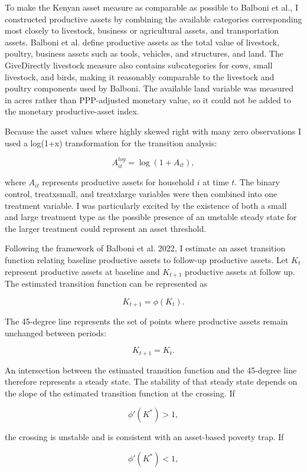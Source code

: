 \documentclass[9pt,twoside]{pnas-new}
\begin{document}
To make the Kenyan asset measure as comparable as possible to Balboni et al., I constructed productive assets by combining the available categories corresponding most closely to livestock, business or agricultural assets, and transportation assets. Balboni et al. define productive assets as the total value of livestock, poultry, business assets such as tools, vehicles, and structures, and land. The GiveDirectly livestock measure also contains subcategories for cows, small livestock, and birds, making it reasonably comparable to the livestock and poultry components used by Balboni. The available land variable was measured in acres rather than PPP-adjusted monetary value, so it could not be added to the monetary productive-asset index.


Because the asset values where highly skewed right with many zero observations I used a log(1+x)
transformation for the transition analysis:

\[
A^{log}_{it} = \log(1 + A_{it}),
\]

where $A_{it}$ represents productive assets for household $i$ at time $t$.
The binary control, treatxsmall, and treatxlarge
variables were then combined into one treatment variable. I was particularly excited by the
existence of both a small and large treatment type as the possible presence of an unstable steady
state for the larger treatment could represent an asset threshold.

Following the framework of Balboni et al. 2022, I estimate an asset transition function
relating baseline productive assets to follow-up productive assets. Let $K_t$ represent productive
assets at baseline and $K_{t+1}$ productive assets at follow up. The estimated transition function
can be represented as

\[
K_{t+1} = \phi(K_t).
\]

The 45-degree line represents the set of points where productive assets remain unchanged
between periods:

\[
K_{t+1} = K_t.
\]

An intersection between the estimated transition function and the 45-degree line therefore
represents a steady state. The stability of that steady state depends on the slope of the estimated
transition function at the crossing. If

\[
\phi'(K^*) > 1,
\]

the crossing is unstable and is consistent with an asset-based poverty trap. If

\[
\phi'(K^*) < 1,
\]
\end{document}
